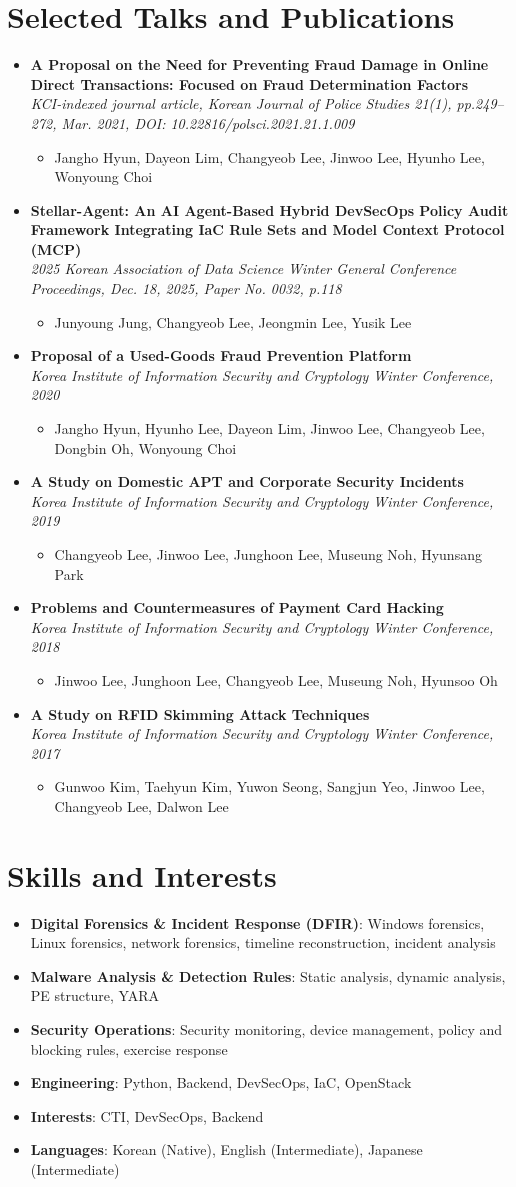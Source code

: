 \documentclass[letterpaper,11pt]{article}
\newcommand{\resumeItem}[1]{
  \item\small{{#1 \vspace{-2pt}}}
}
\newcommand{\resumeTalk}[2]{
  \vspace{-1pt}\item
    \begin{minipage}[t]{0.97\textwidth}
      \textbf{#1} \\
      \textit{\small #2}
    \end{minipage}\vspace{-5pt}
}
\newcommand{\resumeSkill}[2]{
  \item\small{\textbf{#1}: #2}
}
\newcommand{\resumeSubHeadingListStart}{\begin{itemize}[leftmargin=*]}
\newcommand{\resumeSubHeadingListEnd}{\end{itemize}}
\newcommand{\resumeItemListStart}{\begin{itemize}}
\newcommand{\resumeItemListEnd}{\end{itemize}\vspace{-5pt}}
\begin{document}
\section{Selected Talks and Publications}
  \resumeSubHeadingListStart
    \resumeTalk{A Proposal on the Need for Preventing Fraud Damage in Online Direct Transactions: Focused on Fraud Determination Factors}{KCI-indexed journal article, Korean Journal of Police Studies 21(1), pp.249--272, Mar. 2021, DOI: 10.22816/polsci.2021.21.1.009}
      \resumeItemListStart
        \resumeItem{Jangho Hyun, Dayeon Lim, Changyeob Lee, Jinwoo Lee, Hyunho Lee, Wonyoung Choi}
      \resumeItemListEnd
    \resumeTalk{Stellar-Agent: An AI Agent-Based Hybrid DevSecOps Policy Audit Framework Integrating IaC Rule Sets and Model Context Protocol (MCP)}{2025 Korean Association of Data Science Winter General Conference Proceedings, Dec. 18, 2025, Paper No. 0032, p.118}
      \resumeItemListStart
        \resumeItem{Junyoung Jung, Changyeob Lee, Jeongmin Lee, Yusik Lee}
      \resumeItemListEnd
    \resumeTalk{Proposal of a Used-Goods Fraud Prevention Platform}{Korea Institute of Information Security and Cryptology Winter Conference, 2020}
      \resumeItemListStart
        \resumeItem{Jangho Hyun, Hyunho Lee, Dayeon Lim, Jinwoo Lee, Changyeob Lee, Dongbin Oh, Wonyoung Choi}
      \resumeItemListEnd
    \resumeTalk{A Study on Domestic APT and Corporate Security Incidents}{Korea Institute of Information Security and Cryptology Winter Conference, 2019}
      \resumeItemListStart
        \resumeItem{Changyeob Lee, Jinwoo Lee, Junghoon Lee, Museung Noh, Hyunsang Park}
      \resumeItemListEnd
    \resumeTalk{Problems and Countermeasures of Payment Card Hacking}{Korea Institute of Information Security and Cryptology Winter Conference, 2018}
      \resumeItemListStart
        \resumeItem{Jinwoo Lee, Junghoon Lee, Changyeob Lee, Museung Noh, Hyunsoo Oh}
      \resumeItemListEnd
    \resumeTalk{A Study on RFID Skimming Attack Techniques}{Korea Institute of Information Security and Cryptology Winter Conference, 2017}
      \resumeItemListStart
        \resumeItem{Gunwoo Kim, Taehyun Kim, Yuwon Seong, Sangjun Yeo, Jinwoo Lee, Changyeob Lee, Dalwon Lee}
      \resumeItemListEnd
  \resumeSubHeadingListEnd

\section{Skills and Interests}
  \resumeSubHeadingListStart
    \resumeSkill{Digital Forensics \& Incident Response (DFIR)}{Windows forensics, Linux forensics, network forensics, timeline reconstruction, incident analysis}
    \resumeSkill{Malware Analysis \& Detection Rules}{Static analysis, dynamic analysis, PE structure, YARA}
    \resumeSkill{Security Operations}{Security monitoring, device management, policy and blocking rules, exercise response}
    \resumeSkill{Engineering}{Python, Backend, DevSecOps, IaC, OpenStack}
    \resumeSkill{Interests}{CTI, DevSecOps, Backend}
    \resumeSkill{Languages}{Korean (Native), English (Intermediate), Japanese (Intermediate)}
  \resumeSubHeadingListEnd
\end{document}
